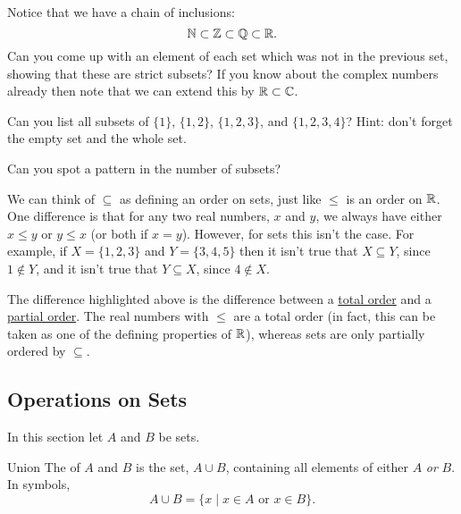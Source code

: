 \documentclass[fleqn]{LectureClass/LectureClass}
\begin{document}
    \begin{exm}{}{}
        Notice that we have a chain of inclusions:
        \begin{equation}
            \mathbb{N} \subset \mathbb{Z} \subset \mathbb{Q} \subset \mathbb{R}.
        \end{equation}
        Can you come up with an element of each set which was not in the previous set, showing that these are strict subsets?
        If you know about the complex numbers already then note that we can extend this by \(\mathbb{R} \subset \mathbb{C}\).
    \end{exm}
    
    \begin{problem}{}{}
        Can you list all subsets of \(\{1\}\), \(\{1, 2\}\), \(\{1, 2, 3\}\), and \(\{1, 2, 3, 4\}\)?
        Hint: don't forget the empty set and the whole set.
        
        Can you spot a pattern in the number of subsets?
    \end{problem}
    
    We can think of \(\subseteq\) as defining an order on sets, just like \(\le\) is an order on \(\mathbb{R}\).
    One difference is that for any two real numbers, \(x\) and \(y\), we always have either \(x \le y\) or \(y \le x\) (or both if \(x = y\)).
    However, for sets this isn't the case.
    For example, if \(X = \{1, 2, 3\}\) and \(Y = \{3, 4, 5\}\) then it isn't true that \(X \subseteq Y\), since \(1 \notin Y\), and it isn't true that \(Y \subseteq X\), since \(4 \notin X\).
    
    \begin{remark}{}{}
        The difference highlighted above is the difference between a \href{https://en.wikipedia.org/wiki/Total_order}{total order} and a \href{https://en.wikipedia.org/wiki/Partially_ordered_set}{partial order}.
        The real numbers with \(\le\) are a total order (in fact, this can be taken as one of the defining properties of \(\mathbb{R}\)), whereas sets are only partially ordered by \(\subseteq\).
    \end{remark}
    
    \subsection{Operations on Sets}
    In this section let \(A\) and \(B\) be sets.
    
    \begin{dfn}{Union}{}
        The  of \(A\) and \(B\) is the set, \(A \cup B\), containing all elements of either \(A\) \emph{or} \(B\).
        In symbols,
        \begin{equation}
            A \cup B = \{x \mid x \in A \text{ or } x \in B\}.
        \end{equation}
    \end{dfn}
    
\end{document}
